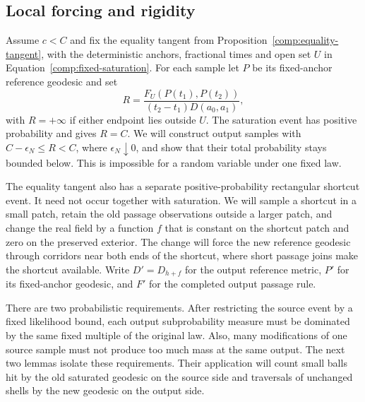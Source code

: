 \subsection{Local forcing and rigidity}

Assume $c<C$ and fix the equality tangent from
Proposition~\ref{comp:equality-tangent}, with the deterministic anchors,
fractional times and open set $U$ in Equation~\eqref{comp:fixed-saturation}.
For each sample let $P$ be its fixed-anchor reference geodesic and set
\begin{equation}\label{comp:output-ratio}
 R=\frac{F_U(P(t_1),P(t_2))}{(t_2-t_1)D(a_0,a_1)},
\end{equation}
with $R=+\infty$ if either endpoint lies outside $U$.
The saturation event has positive probability and gives $R=C$.
We will construct output samples with $C-\epsilon_N\le R<C$, where
$\epsilon_N\downarrow0$, and show that their total probability stays
bounded below.  This is impossible for a random variable under one
fixed law.

The equality tangent also has a separate positive-probability
rectangular shortcut event.  It need not occur together with saturation.
We will sample a shortcut in a small patch, retain the old passage
observations outside a larger patch, and change the real field by a
function $f$ that is constant on the shortcut patch and zero on the
preserved exterior.  The change will force the new reference geodesic
through corridors near both ends of the shortcut, where short passage
joins make the shortcut available.  Write $D'=D_{h+f}$ for the output
reference metric, $P'$ for its fixed-anchor geodesic, and $F'$ for the
completed output passage rule.

There are two probabilistic requirements.  After restricting the source
event by a fixed likelihood bound, each output subprobability measure
must be dominated by the same fixed multiple of the original law.
Also, many modifications of one source sample must not produce too much
mass at the same output.  The next two lemmas isolate these requirements.
Their application will count small balls hit by the old saturated
geodesic on the source side and traversals of unchanged shells by the
new geodesic on the output side.

